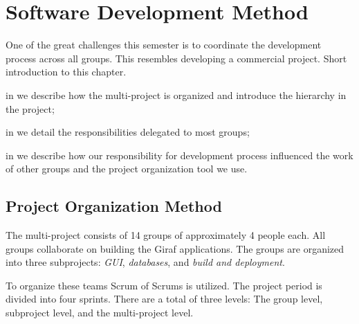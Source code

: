 \chapter{Software Development Method}\label{chap:sw_dev_method}
One of the great challenges this semester is to coordinate the development process across all groups. This resembles developing a commercial project. 
Short introduction to this chapter. \dummy~\dummy~\dummy~\dummy~\dummy~\dummy

\begin{chapterorganization}
  \item in  we describe how the multi-project is organized and introduce the hierarchy in the project;
  \item in  we detail the responsibilities delegated to most groups;
  \item in  we describe how our responsibility for development process influenced the work of other groups and the project organization tool we use.
\end{chapterorganization}

\section{Project Organization Method}\label{sec:project_overview}
The multi-project consists of 14 groups of approximately 4 people each. All groups collaborate on building the Giraf applications. The groups are organized into three subprojects: \emph{GUI}, \emph{databases}, and \emph{build and deployment}.

To organize these teams Scrum of Scrums  is utilized. The project period is divided into four sprints. There are a total of three levels: The group level, subproject level, and the multi-project level.

